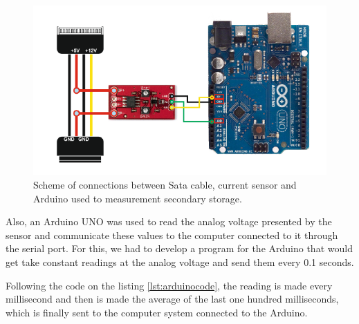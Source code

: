 \begin{figure}[H]
  \caption{Scheme of connections between Sata cable, current sensor and Arduino used to measurement secondary storage.}
  \centering
  \includegraphics[width=\linewidth]{Chapters/images/arduino.png}
\end{figure}

Also, an Arduino UNO was used to read the analog voltage presented by the sensor and communicate these values to the computer connected to it through the serial port. For this, we had to develop a program for the Arduino that would get take constant readings at the analog voltage and send them every 0.1 seconds. 

  

Following the code on the listing \ref{lst:arduinocode}, the reading is made every millisecond and then is made the average of the last one hundred milliseconds, which is finally sent to the computer system connected to the Arduino.
